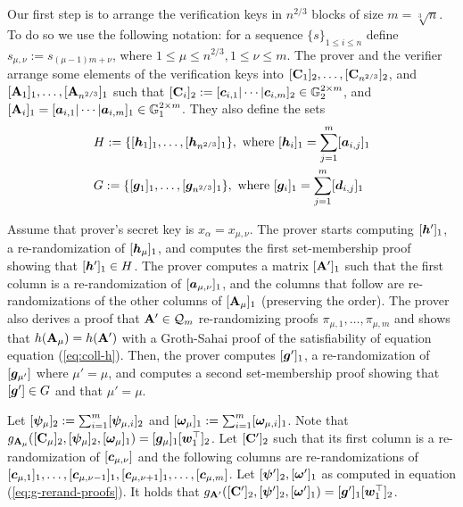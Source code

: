 Our first step is to arrange the verification keys in $n^{2/3}$ blocks of size $m=\sqrt[3]{n}$. To do so we use the following notation: for a sequence $\{s\}_{1\leq i \leq n}$ define $s_{\mu,\nu}:=s_{(\mu-1)m+\nu}$, where  $1\leq\mu\leq n^{2/3},1\leq \nu\leq m$. The prover and the verifier arrange some elements of the verification keys into $[\mathbf{{C}}_1]_2,\ldots, [\mathbf{{C}}_{n^{2/3}}]_2$, and $[\mathbf{{A}}_1]_1,\ldots, [\mathbf{{A}}_{n^{2/3}}]_1$ such that $[\mathbf{{C}}_i]_2:= [{\boldsymbol{c}}_{i,1}|\cdots|{\boldsymbol{c}}_{i,m}]_2\in\mathbb{G}_2^{2\times m}$,  and $[\mathbf{{A}}_i]_1=[{\boldsymbol{a}}_{i,1}|\cdots|{\boldsymbol{a}}_{i,m}]_1\in\mathbb{G}^{2\times m}_1$. They also define the sets
\begin{align*}
&H:=\{[{\boldsymbol{h}}_1]_1,\ldots,\allowbreak [{\boldsymbol{h}}_{n^{2/3}}]_1\},\text{ where }[{\boldsymbol{h}}_i]_1 = \sum_{j=1}^m [{\boldsymbol{a}}_{i,j}]_1 \\
&G:=\{[{\boldsymbol{g}}_1]_1,\ldots,[{\boldsymbol{g}}_{n^{2/3}}]_1\},\text{ where } [{\boldsymbol{g}}_i]_1 =  \sum_{j=1}^m [{\boldsymbol{d}}_{i,j}]_1
\end{align*}

Assume that prover's secret key is $x_\alpha = x_{\mu,\nu}$.
The prover starts computing $[{\boldsymbol{h}}']_1$,
a re-randomization of $[{\boldsymbol{h}}_\mu]_1$, and computes the first set-membership proof showing that $[{\boldsymbol{h}}']_1\in H$.
The prover computes a matrix $[\mathbf{{A}}']_1$ such that the first column is a re-randomization of $[{\boldsymbol{a}}_{\mu,\nu}]_1$, and the columns that follow are re-randomizations of the other columns of $[\mathbf{{A}}_\mu]_1$ (preserving the order). The prover also derives a proof that $\mathbf{{A}}'\in\mathcal{Q}_m$ re-randomizing proofs $\pi_{\mu,1},\ldots,\pi_{\mu,m}$ and shows that $h(\mathbf{{A}}_\mu)=h(\mathbf{{A}}')$ with a Groth-Sahai proof of the satisfiability of equation equation (\ref{eq:coll-h}). Then, the prover computes $[{\boldsymbol{g}}']_1$, a re-randomization of $[{\boldsymbol{g}}_{\mu'}]$ where $\mu'=\mu$, and computes a  second set-membership proof showing that $[{\boldsymbol{g}}']\in G$ and that $\mu'=\mu$.

Let $[{\boldsymbol{\psi}}_\mu]_2 := \sum_{i=1}^m[{\boldsymbol{\psi}}_{\mu,i}]_2$ and $[{\boldsymbol{\omega}}_\mu]_1 := \sum_{i=1}^m[{\boldsymbol{\omega}}_{\mu,i}]_1$. Note that $g_{\mathbf{{A}}_\mu}([\mathbf{{C}}_\mu]_2,\allowbreak[{\boldsymbol{\psi}}_\mu]_2,[{\boldsymbol{\omega}}_\mu]_1) = [{\boldsymbol{g}}_\mu]_1[{\boldsymbol{w}}_1^\top]_2$. Let $[\mathbf{{C}}']_2$ such that its first column is a re-ran\-do\-mi\-za\-tion of $[{\boldsymbol{c}}_{\mu,\nu}]$ and the following columns are re-ran\-do\-mi\-za\-tions of $[{\boldsymbol{c}}_{\mu,1}]_1,\ldots,\allowbreak[{\boldsymbol{c}}_{\mu,\nu-1}]_1,\allowbreak[{\boldsymbol{c}}_{\mu,\nu+1}]_1,\ldots,[{\boldsymbol{c}}_{\mu,m}]$. Let $[{\boldsymbol{\psi}}']_2,[{\boldsymbol{\omega}}']_1$ as computed in equation (\ref{eq:g-rerand-proofs}).  It holds that $g_{\mathbf{{A}}'}([\mathbf{{C}}']_2,[{\boldsymbol{\psi}}']_2,[{\boldsymbol{\omega}}']_1) = [{\boldsymbol{g}}']_1[{\boldsymbol{w}}_1^\top]_2$.

